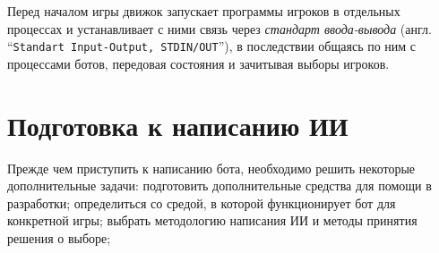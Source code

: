 \documentclass[12pt]{report}
\begin{document}
Перед началом игры движок запускает программы игроков в отдельных процессах и устанавливает с ними связь через \emph{стандарт ввода-вывода} (англ. ``\texttt{Standart Input-Output, STDIN/OUT}''), в последствии общаясь по ним с процессами ботов, передовая состояния и зачитывая выборы игроков.



\section{Подготовка к написанию ИИ}
Прежде чем приступить к написанию бота, необходимо решить некоторые дополнительные задачи: подготовить дополнительные средства для помощи в разработки; определиться со средой, в которой функционирует бот для конкретной игры; выбрать методологию написания ИИ и методы принятия решения о выборе;
\end{document}
